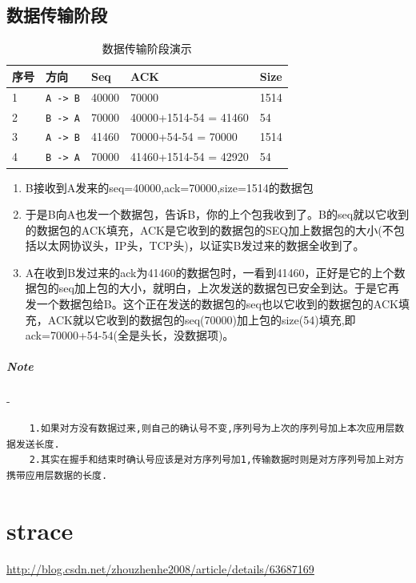 \documentclass[UTF8,a4paper,12pt]{ctexbook}
\begin{document}
		\subsection{数据传输阶段}
			\begin{table}[htbp]
				\centering
				\caption{数据传输阶段演示}
				\begin{tabular}{m{1cm}|m{3cm}|m{4cm}|m{4cm}|m{1cm}}
					\toprule
						序号 & 方向 & Seq & ACK & Size\\
					\midrule
						1& \verb|A -> B|& 40000 & 70000 				&  1514 \\
						2& \verb|B -> A|& 70000 & 40000+1514-54 = 41460 &  54 \\
						3& \verb|A -> B|& 41460 & 70000+54-54 = 70000   &  1514 \\
						4& \verb|B -> A|& 70000 & 41460+1514-54 = 42920 &  54 \\
					\bottomrule
				\end{tabular}
			\end{table}
			\begin{enumerate}
				\item B接收到A发来的seq=40000,ack=70000,size=1514的数据包
				\item 于是B向A也发一个数据包，告诉B，你的上个包我收到了。B的seq就以它收到的数据包的ACK填充，ACK是它收到的数据包的SEQ加上数据包的大小(不包括以太网协议头，IP头，TCP头)，以证实B发过来的数据全收到了。
				\item A在收到B发过来的ack为41460的数据包时，一看到41460，正好是它的上个数据包的seq加上包的大小，就明白，上次发送的数据包已安全到达。于是它再发一个数据包给B。这个正在发送的数据包的seq也以它收到的数据包的ACK填充，ACK就以它收到的数据包的seq(70000)加上包的size(54)填充,即ack=70000+54-54(全是头长，没数据项)。
			\end{enumerate}
			
		\subparagraph{Note}-
		
			\begin{lstlisting}
	1.如果对方没有数据过来,则自己的确认号不变,序列号为上次的序列号加上本次应用层数据发送长度.
	2.其实在握手和结束时确认号应该是对方序列号加1,传输数据时则是对方序列号加上对方携带应用层数据的长度.
			\end{lstlisting}
	\section{strace}
		\url{http://blog.csdn.net/zhouzhenhe2008/article/details/63687169}
		
\end{document}
